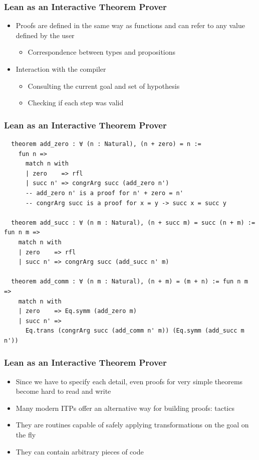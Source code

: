 \documentclass[usepdftitle=false,aspectratio=169,usenames,dvipsnames]{beamer}
\newcommand\vitem{\vfill\item}
\begin{document}
\begin{frame}
  \frametitle{Lean as an Interactive Theorem Prover}
  \begin{itemize}
    \item Proofs are defined in the same way as functions and can refer to any value defined by the user
    \begin{itemize}
      \item Correspondence between types and propositions
    \end{itemize}
    \vitem Interaction with the compiler
    \begin{itemize}
      \item Consulting the current goal and set of hypothesis
      \item Checking if each step was valid
    \end{itemize}
  \end{itemize}
\end{frame}

\begin{frame}[fragile]
  \frametitle{Lean as an Interactive Theorem Prover}
  \begin{verbatim}
  theorem add_zero : ∀ (n : Natural), (n + zero) = n :=
    fun n =>
      match n with
      | zero    => rfl
      | succ n' => congrArg succ (add_zero n')
      -- add_zero n' is a proof for n' + zero = n'
      -- congrArg succ is a proof for x = y -> succ x = succ y

  theorem add_succ : ∀ (n m : Natural), (n + succ m) = succ (n + m) := fun n m =>
    match n with
    | zero    => rfl
    | succ n' => congrArg succ (add_succ n' m)

  theorem add_comm : ∀ (n m : Natural), (n + m) = (m + n) := fun n m =>
    match n with
    | zero    => Eq.symm (add_zero m)
    | succ n' =>
      Eq.trans (congrArg succ (add_comm n' m)) (Eq.symm (add_succ m n'))
  \end{verbatim}
\end{frame}

\begin{frame}
  \frametitle{Lean as an Interactive Theorem Prover}
  \begin{itemize}
    \item Since we have to specify each detail, even proofs for very simple theorems become hard to read and write
    \vitem Many modern ITPs offer an alternative way for building proofs: tactics
    \vitem They are routines capable of safely applying transformations on the goal on the fly
    \vitem They can contain arbitrary pieces of code
  \end{itemize}
\end{frame}
\end{document}
